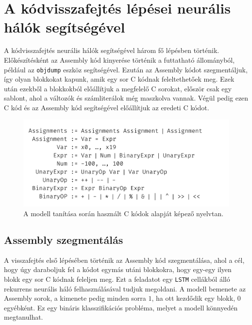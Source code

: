 \chapter{A kódvisszafejtés lépései neurális hálók segítségével}
\label{ch:decomp}

A kódvisszafejtés neurális hálók segítségével három fő lépésben történik.
Előkészítésként az Assembly kód kinyerése történik a futtatható állományból,
például az \texttt{objdump}\cite{binutils} eszköz segítségével. Ezután az Assembly
kódot szegmentáljuk, így olyan blokkokat kapunk, amik egy sor C kódnak feleltethetőek
meg. Ezek után ezekből a blokkokból előállítjuk a megfelelő C sorokat, először csak
egy sablont, ahol a változók és számliterálok még maszkolva vannak. Végül pedig ezen
C kód és az Assembly kód segítségével előállítjuk az eredeti C kódot.

\begin{figure}[H]
	\centering
	\includegraphics[width=1\textwidth,frame]{images/grammar.pdf}
	\caption{A modell tanítása során használt C kódok alapját képező nyelvtan.}
	\label{fig:grammar}
\end{figure}

\section{Assembly szegmentálás}

A visszafejtés első lépésében történik az Assembly kód szegmentálása, ahol
a cél, hogy úgy daraboljuk fel a kódot egymás utáni blokkokra, hogy egy-egy ilyen blokk egy
sor C kódnak feleljen meg. Ezt a feladatot egy \texttt{LSTM}\cite{lstm} cellákból álló
rekurrens neurális háló felhasználásával tudjuk megoldani. A modell bemenete az Assembly sorok,
a kimenete pedig minden sorra $1$, ha ott kezdődik egy blokk, $0$ egyébként. Ez
egy bináris klasszifikációs probléma, melyet a modell könnyedén megtanulhat.

